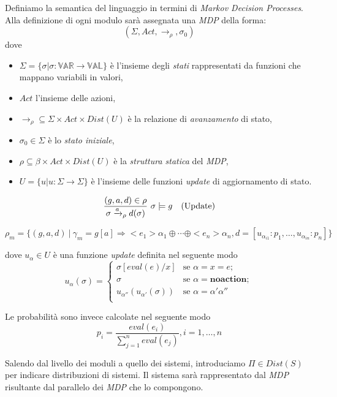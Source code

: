 Definiamo la semantica del linguaggio in termini di \emph{Markov Decision Processes}. Alla definizione di ogni modulo sarà assegnata una \emph{MDP} della forma:
$$ (\Sigma,Act,\rightarrow_\rho,\sigma_0) $$
dove 
\begin{itemize}
	\item $\Sigma = \{\sigma | \sigma : \mathbb{VAR} \rightarrow \mathbb{VAL}\}$ è l'insieme degli \emph{stati} rappresentati da funzioni che mappano variabili in valori,
	\item $Act$ l'insieme delle azioni,
	\item $\rightarrow_\rho \subseteq \Sigma \times Act \times Dist(U)$ è la relazione di \emph{avanzamento} di stato,
	\item $\sigma_0 \in \Sigma$ è lo \emph{stato iniziale},
	\item $\rho \subseteq \beta \times Act \times Dist(U)$ è la \emph{struttura statica} del \emph{MDP},
	\item $U = \{u | u : \Sigma \rightarrow \Sigma \}$ è l'insieme delle funzioni \emph{update} di aggiornamento di stato.
\end{itemize}

$$
\begin{array}{cl}
	\displaystyle{\frac{(g,a,d) \in \rho}{\sigma \xrightarrow{a}_\rho d(\sigma)} \mbox{ }\sigma \models g} & \mbox{(Update)} \\
\end{array}
$$

$$
\rho_m = \{(g,a,d)\ |\ \gamma_m = g[a] \Rightarrow <e_1> \alpha_1 \oplus \cdots \oplus <e_n> \alpha_n, d=[u_{\alpha_{i 1}}:p_1, \dots, u_{\alpha_{i n}}:p_n]\}
$$

dove $u_\alpha \in U$ è una funzione \emph{update} definita nel seguente modo
$$ 
u_{\alpha}(\sigma) = \left\{
\begin{array}{ll}
	\sigma[eval(e)/x]	& \mbox{se } \alpha = x = e; \\
	\sigma				& \mbox{se } \alpha = \mathbf{noaction}; \\
	u_{\alpha''}(u_{\alpha'}(\sigma))	& \mbox{se } \alpha = \alpha' \alpha'' \\
\end{array}
\right.
$$

Le probabilità sono invece calcolate nel seguente modo
$$ p_i = \frac{eval(e_i)}{\sum_{j=1}^{n}eval(e_j)},i=1,\dots,n $$

Salendo dal livello dei moduli a quello dei sistemi, introduciamo $\Pi \in Dist(S) $ per indicare distribuzioni di sistemi. Il sistema sarà rappresentato dal \emph{MDP} risultante dal parallelo dei \emph{MDP} che lo compongono.

